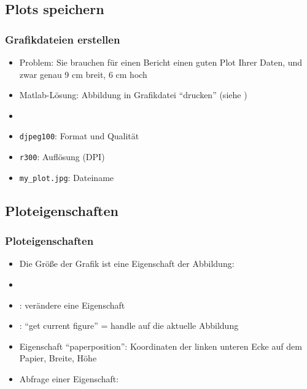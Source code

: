       \subsection{Plots speichern}
      \begin{frame}
          \frametitle{Grafikdateien erstellen}
          \begin{itemize}
              \item Problem: Sie brauchen für einen Bericht einen guten Plot Ihrer Daten, und zwar genau 9 cm breit, 6 cm hoch
              \item Matlab-Lösung: Abbildung in Grafikdatei ``drucken'' (siehe )
              \item {}
              \item \texttt{djpeg100}: Format und Qualität
              \item \texttt{r300}: Auflösung (DPI)
              \item \texttt{my\_plot.jpg}: Dateiname
          \end{itemize}
      \end{frame}

      \subsection{Ploteigenschaften}
      \begin{frame}
          \frametitle{Ploteigenschaften}
          \begin{itemize}
              \item Die Größe der Grafik ist eine Eigenschaft der Abbildung:
              \item {} 
              \item {}: verändere eine Eigenschaft
              \item {}: ``get current figure'' = handle auf die aktuelle Abbildung
              \item Eigenschaft ``paperposition'': Koordinaten der linken unteren Ecke auf dem Papier, Breite, Höhe
              \item Abfrage einer Eigenschaft: 
          \end{itemize}
      \end{frame}

